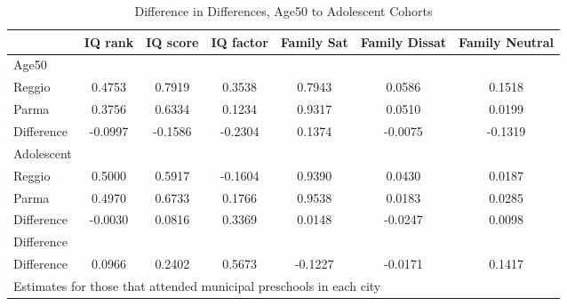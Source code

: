 \begin{table}[htbp]\centering
\caption{Difference in Differences, Age50 to Adolescent Cohorts}
\begin{tabular}{l*{6}{c}}
\hline\hline
            &     IQ rank&    IQ score&   IQ factor&  Family Sat&Family Dissat&Family Neutral\\
\hline
Age50       &            &            &            &            &            &            \\
Reggio      &      0.4753&      0.7919&      0.3538&      0.7943&      0.0586&      0.1518\\
Parma       &      0.3756&      0.6334&      0.1234&      0.9317&      0.0510&      0.0199\\
Difference  &     -0.0997&     -0.1586&     -0.2304&      0.1374&     -0.0075&     -0.1319\\
\hline
Adolescent  &            &            &            &            &            &            \\
Reggio      &      0.5000&      0.5917&     -0.1604&      0.9390&      0.0430&      0.0187\\
Parma       &      0.4970&      0.6733&      0.1766&      0.9538&      0.0183&      0.0285\\
Difference  &     -0.0030&      0.0816&      0.3369&      0.0148&     -0.0247&      0.0098\\
\hline
Difference  &            &            &            &            &            &            \\
Difference  &      0.0966&      0.2402&      0.5673&     -0.1227&     -0.0171&      0.1417\\
\hline\hline
\multicolumn{7}{l}{\footnotesize Estimates for those that attended municipal preschools in each city}\\
\end{tabular}
\end{table}
